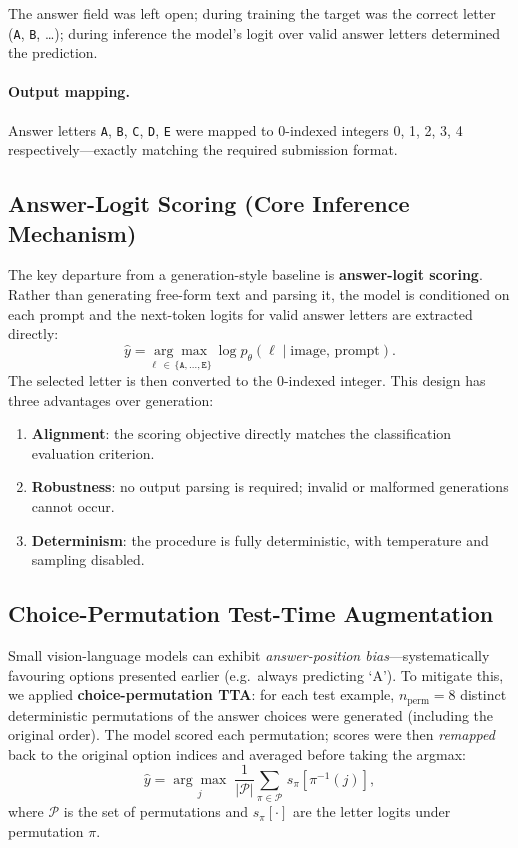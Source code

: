 \documentclass[11pt,twocolumn]{article}
\begin{document}
The answer field was left open; during training the target was the correct letter (\texttt{A}, \texttt{B}, \ldots); during inference the model's logit over valid answer letters determined the prediction.

\paragraph{Output mapping.}
Answer letters \texttt{A}, \texttt{B}, \texttt{C}, \texttt{D}, \texttt{E} were mapped to 0-indexed integers 0, 1, 2, 3, 4 respectively---exactly matching the required submission format.

\subsection{Answer-Logit Scoring (Core Inference Mechanism)}
\label{sec:logit}

The key departure from a generation-style baseline is \textbf{answer-logit scoring}. Rather than generating free-form text and parsing it, the model is conditioned on each prompt and the next-token logits for valid answer letters are extracted directly:
\begin{equation}
  \hat{y} = \underset{\ell\,\in\,\{\texttt{A},\ldots,\texttt{E}\}}{\arg\max}\ \log p_\theta(\ell \mid \text{image, prompt}).
  \label{eq:logit}
\end{equation}
The selected letter is then converted to the 0-indexed integer. This design has three advantages over generation:
\begin{enumerate}[leftmargin=*, noitemsep, topsep=2pt]
  \item \textbf{Alignment}: the scoring objective directly matches the classification evaluation criterion.
  \item \textbf{Robustness}: no output parsing is required; invalid or malformed generations cannot occur.
  \item \textbf{Determinism}: the procedure is fully deterministic, with temperature and sampling disabled.
\end{enumerate}

\subsection{Choice-Permutation Test-Time Augmentation}
\label{sec:tta}

Small vision-language models can exhibit \emph{answer-position bias}---systematically favouring options presented earlier (e.g.\ always predicting `A'). To mitigate this, we applied \textbf{choice-permutation TTA}: for each test example, $n_\text{perm}=8$ distinct deterministic permutations of the answer choices were generated (including the original order). The model scored each permutation; scores were then \emph{remapped} back to the original option indices and averaged before taking the argmax:
\begin{equation}
  \hat{y} = \underset{j}{\arg\max}\;\frac{1}{|\mathcal{P}|}\sum_{\pi\in\mathcal{P}}\,s_\pi\!\left[\pi^{-1}(j)\right],
  \label{eq:tta}
\end{equation}
where $\mathcal{P}$ is the set of permutations and $s_\pi[\cdot]$ are the letter logits under permutation $\pi$.
\end{document}
